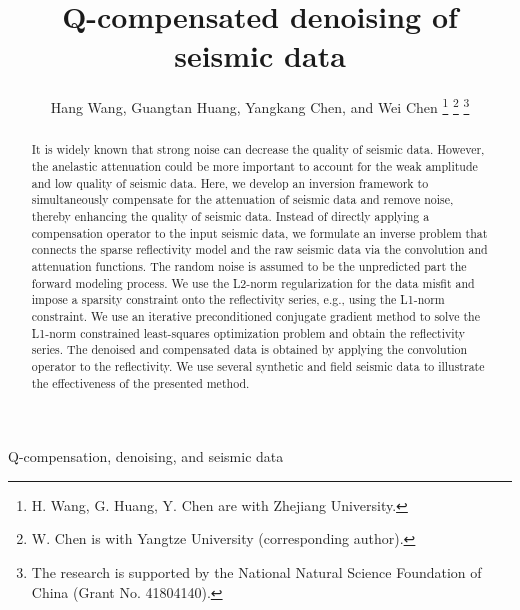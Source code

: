 \title{Q-compensated denoising of seismic data}
\renewcommand{\thefootnote}{\fnsymbol{footnote}}
\author{Hang Wang, Guangtan Huang, Yangkang Chen, and Wei Chen
\thanks{H. Wang, G. Huang, Y. Chen are with Zhejiang University.}
\thanks{W. Chen is with Yangtze University (corresponding author).}
\thanks{The research is supported by the National Natural Science Foundation of China (Grant No. 41804140).}}
\maketitle




\begin{abstract}
It is widely known that strong noise can decrease the quality of seismic data. However, the anelastic attenuation could be more important to account for the weak amplitude and low quality of seismic data. Here, we develop an inversion framework to simultaneously compensate for the attenuation of seismic data and remove noise, thereby enhancing the quality of seismic data. Instead of directly applying a compensation operator to the input seismic data, we formulate an inverse problem that connects the sparse reflectivity model and the raw seismic data %
via the convolution and attenuation functions. The random noise is assumed to be the unpredicted part  the forward modeling process. We use the L2-norm regularization for the data misfit and impose a sparsity constraint onto the reflectivity series, e.g., using the L1-norm constraint. We use an iterative preconditioned conjugate gradient method to solve the L1-norm constrained least-squares optimization problem and obtain the  reflectivity series. The denoised and compensated data is obtained by applying the convolution operator to the reflectivity. We use several synthetic and field seismic data to illustrate the effectiveness of the presented method.
\end{abstract}

\begin{keywords}
Q-compensation, denoising, and seismic data
\end{keywords}

